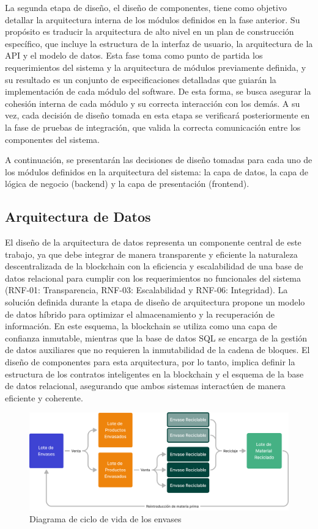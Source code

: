 La segunda etapa de diseño, el diseño de componentes, tiene como objetivo detallar la arquitectura interna de los módulos definidos en la fase anterior. Su propósito es traducir la arquitectura de alto nivel en un plan de construcción específico, que incluye la estructura de la interfaz de usuario, la arquitectura de la API y el modelo de datos. Esta fase toma como punto de partida los requerimientos del sistema y la arquitectura de módulos previamente definida, y su resultado es un conjunto de especificaciones detalladas que guiarán la implementación de cada módulo del software. De esta forma, se busca asegurar la cohesión interna de cada módulo y su correcta interacción con los demás. A su vez, cada decisión de diseño tomada en esta etapa se verificará posteriormente en la fase de pruebas de integración, que valida la correcta comunicación entre los componentes del sistema.

A continuación, se presentarán las decisiones de diseño tomadas para cada uno de los módulos definidos en la arquitectura del sistema: la capa de datos, la capa de lógica de negocio (backend) y la capa de presentación (frontend).

\subsection{Arquitectura de Datos}

El diseño de la arquitectura de datos representa un componente central de este trabajo, ya que debe integrar de manera transparente y eficiente la naturaleza descentralizada de la blockchain con la eficiencia y escalabilidad de una base de datos relacional para cumplir con los requerimientos no funcionales del sistema (RNF-01: Transparencia, RNF-03: Escalabilidad y RNF-06: Integridad). La solución definida durante la etapa de diseño de arquitectura propone un modelo de datos híbrido para optimizar el almacenamiento y la recuperación de información. En este esquema, la blockchain se utiliza como una capa de confianza inmutable, mientras que la base de datos SQL se encarga de la gestión de datos auxiliares que no requieren la inmutabilidad de la cadena de bloques. El diseño de componentes para esta arquitectura, por lo tanto, implica definir la estructura de los contratos inteligentes en la blockchain y el esquema de la base de datos relacional, asegurando que ambos sistemas interactúen de manera eficiente y coherente.

\begin{figure}[!htb]
    \centering
    \includegraphics[width=\linewidth]{Figures/data-lifecycle.png}
    \caption{Diagrama de ciclo de vida de los envases}
    \label{fig:data-lifecycle}
\end{figure}

